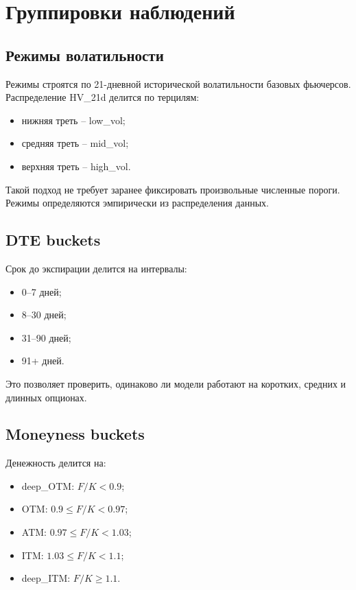 \documentclass[11pt,a4paper]{article}
\begin{document}
\section{Группировки наблюдений}

\subsection{Режимы волатильности}

Режимы строятся по 21-дневной исторической волатильности базовых фьючерсов. Распределение HV\_21d делится по терцилям:

\begin{itemize}
    \item нижняя треть -- low\_vol;
    \item средняя треть -- mid\_vol;
    \item верхняя треть -- high\_vol.
\end{itemize}

Такой подход не требует заранее фиксировать произвольные численные пороги. Режимы определяются эмпирически из распределения данных.

\subsection{DTE buckets}

Срок до экспирации делится на интервалы:

\begin{itemize}
    \item 0--7 дней;
    \item 8--30 дней;
    \item 31--90 дней;
    \item 91+ дней.
\end{itemize}

Это позволяет проверить, одинаково ли модели работают на коротких, средних и длинных опционах.

\subsection{Moneyness buckets}

Денежность делится на:

\begin{itemize}
    \item deep\_OTM: $F/K<0.9$;
    \item OTM: $0.9 \leq F/K <0.97$;
    \item ATM: $0.97 \leq F/K <1.03$;
    \item ITM: $1.03 \leq F/K <1.1$;
    \item deep\_ITM: $F/K \geq 1.1$.
\end{itemize}
\end{document}
